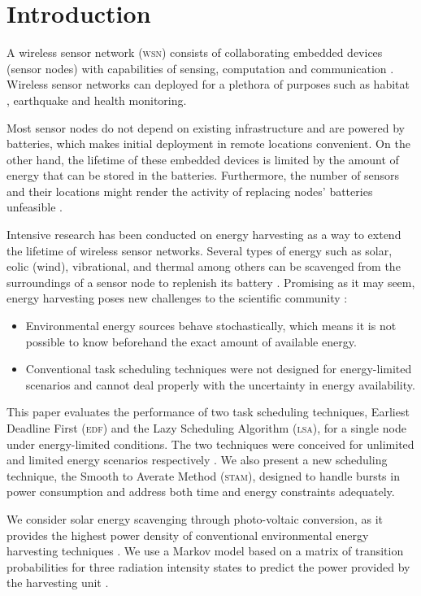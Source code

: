 \section{Introduction}\label{sec:introduction}

A wireless sensor network (\textsc{wsn}) consists of collaborating embedded devices (sensor nodes) with capabilities of sensing, computation and communication
\cite{sudevalyam2010energy}. Wireless sensor networks can deployed for a plethora of purposes such as habitat \cite{mainwaring2002wireless},
earthquake \cite{suzuki2007earthquake} and health \cite{saadaoui2007architecture} monitoring.

Most sensor nodes do not depend on existing infrastructure and are powered by batteries, which makes initial deployment in remote locations
convenient. On the other hand, the lifetime of these embedded devices is limited by the amount of energy that can be stored in the batteries. Furthermore, 
the number of sensors and their locations might render the activity of replacing nodes' batteries unfeasible \cite{moser2007real}. 

Intensive research has been conducted on energy harvesting as a way to extend the lifetime of wireless sensor networks. Several types of energy such as
solar, eolic (wind), vibrational, and thermal among others can be scavenged from the surroundings of a sensor node to replenish its battery \cite{roundy2004power}. 
Promising as it may seem, energy harvesting poses new challenges to the scientific community \cite{lu2010accurate}:

\begin{itemize}
	\item Environmental energy sources behave stochastically, which means it is not possible to know beforehand the exact amount of available energy.
	\item Conventional task scheduling techniques were not designed for energy-limited scenarios and cannot deal properly with the uncertainty in energy availability.
\end{itemize}

This paper evaluates the performance of two task scheduling techniques, Earliest Deadline First (\textsc{edf}) and the Lazy Scheduling
Algorithm (\textsc{lsa}), for a single node under energy-limited conditions. The two techniques were conceived for unlimited and limited energy scenarios respectively \cite{moser2007real}. We also present a new scheduling technique, the Smooth to Averate Method
(\textsc{stam}), designed to handle bursts in power consumption and address both time and energy constraints adequately.  

We consider solar energy scavenging through photo-voltaic conversion, as it provides the highest power density of conventional environmental energy harvesting techniques
\cite{raghunathan2005design}. We use a Markov model based on a matrix of transition probabilities for three radiation intensity states to predict
the power provided by the harvesting unit \cite{poggi2000stochastic}.